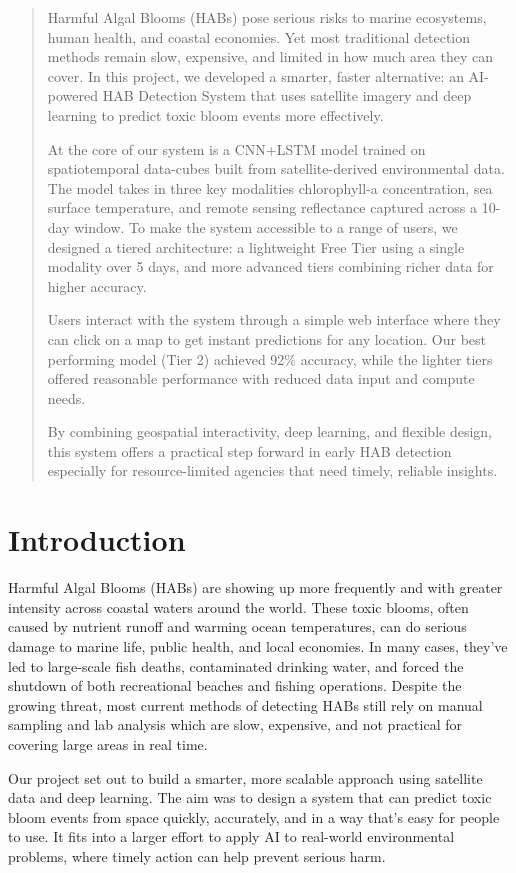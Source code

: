 \documentclass[conference]{IEEEtran}
\begin{document}
\begin{abstract}
Harmful Algal Blooms (HABs) pose serious risks to marine ecosystems, human health, and coastal economies. Yet most traditional detection methods remain slow, expensive, and limited in how much area they can cover. In this project, we developed a smarter, faster alternative: an AI-powered HAB Detection System that uses satellite imagery and deep learning to predict toxic bloom events more effectively.

At the core of our system is a CNN+LSTM model trained on spatiotemporal data-cubes built from satellite-derived environmental data. The model takes in three key modalities chlorophyll-a concentration, sea surface temperature, and remote sensing reflectance captured across a 10-day window. To make the system accessible to a range of users, we designed a tiered architecture: a lightweight Free Tier using a single modality over 5 days, and more advanced tiers combining richer data for higher accuracy.

Users interact with the system through a simple web interface where they can click on a map to get instant predictions for any location. Our best performing model (Tier 2) achieved 92\% accuracy, while the lighter tiers offered reasonable performance with reduced data input and compute needs.

By combining geospatial interactivity, deep learning, and flexible design, this system offers a practical step forward in early HAB detection especially for resource-limited agencies that need timely, reliable insights.
\end{abstract}

\section{Introduction}
Harmful Algal Blooms (HABs) are showing up more frequently and with greater intensity across coastal waters around the world. These toxic blooms, often caused by nutrient runoff and warming ocean temperatures, can do serious damage to marine life, public health, and local economies. In many cases, they've led to large-scale fish deaths, contaminated drinking water, and forced the shutdown of both recreational beaches and fishing operations. Despite the growing threat, most current methods of detecting HABs still rely on manual sampling and lab analysis which are slow, expensive, and not practical for covering large areas in real time.

Our project set out to build a smarter, more scalable approach using satellite data and deep learning. The aim was to design a system that can predict toxic bloom events from space quickly, accurately, and in a way that's easy for people to use. It fits into a larger effort to apply AI to real-world environmental problems, where timely action can help prevent serious harm.
\end{document}
